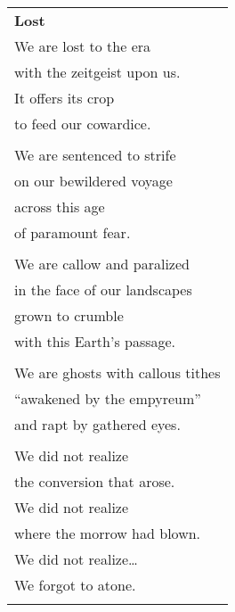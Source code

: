 \documentclass{article}
\begin{document}
\begin{center}
\begin{tabular}{l}
\textbf{Lost}
\\
We are lost to the era \\
with the zeitgeist upon us. \\
It offers its crop \\
to feed our cowardice. \\
\\
We are sentenced to strife \\
on our bewildered voyage \\
across this age \\
of paramount fear. \\
\\
We are callow and paralized \\
in the face of our landscapes \\
grown to crumble \\
with this Earth's passage. \\
\\
We are ghosts with callous tithes \\
``awakened by the empyreum'' \\
and rapt by gathered eyes. \\
\\
We did not realize \\
the conversion that arose. \\
We did not realize \\
where the morrow had blown. \\ %
We did not realize\ldots{} \\
We forgot to atone. \\
\\
\end{tabular}
\end{center}
\end{document}
